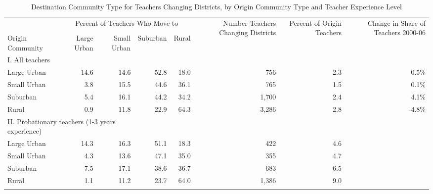 \documentclass[]{article}
\begin{document}
\begin{longtable}{lrrrrrrr}
  \hline
 & \multicolumn{4}{c}{\multirow{2}{*}{Percent of Teachers Who Move to}} & \multirow{4}{*}{\parbox{0.13\linewidth}{Number Teachers Changing Districts}} & \multirow{4}{*}{\parbox{0.12\linewidth}{Percent of Origin Teachers}} & \multirow{4}{*}{\parbox{0.16\linewidth}{Change in Share of Teachers 2000-06}}\\
 & \multicolumn{4}{c}{} & & & \\ \cline{2-5}
& & & & & & & \\
Origin Community & Large Urban & Small Urban & Suburban & Rural &  &  &  \\ 
  \hline
I. All teachers & & & & & & & \\
\quad Large Urban & 14.6 & 14.6 & 52.8 & 18.0 & 756 & 2.3 & 0.5\% \\ 
  \quad Small Urban & 3.8 & 15.5 & 44.6 & 36.1 & 765 & 1.5 & 0.1\% \\ 
  \quad Suburban & 5.4 & 16.1 & 44.2 & 34.2 & 1,700 & 2.4 & 4.1\% \\ 
  \quad Rural & 0.9 & 11.8 & 22.9 & 64.3 & 3,286 & 2.8 & -4.8\% \\ 
\multicolumn{3}{l}{II. Probationary teachers (1-3 years experience)} & & & & & \\
  \quad Large Urban & 14.3 & 16.3 & 51.1 & 18.3 & 422 & 4.6 &  \\ 
  \quad Small Urban & 4.3 & 13.6 & 47.1 & 35.0 & 355 & 4.7 &  \\ 
  \quad Suburban & 7.5 & 17.1 & 38.6 & 36.7 & 683 & 6.5 &  \\ 
  \quad Rural & 1.1 & 11.2 & 23.7 & 64.0 & 1,386 & 9.0 &  \\ 
   \hline
\caption{Destination Community Type for Teachers Changing Districts, by Origin Community Type and Teacher Experience Level} 
\label{tbl:markov}
\end{longtable}
\end{document}
